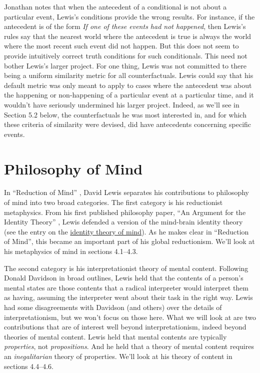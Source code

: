Jonathan \citet{Bennett2003} notes that when the antecedent of a conditional is not about a particular event, Lewis's conditions provide the wrong results. For instance, if the antecedent is of the form \textit{If one of these events had not happened}, then Lewis's rules say that the nearest world where the antecedent is true is always the world where the most recent such event did not happen. But this does not seem to provide intuitively correct truth conditions for such conditionals. This need not bother Lewis's larger project. For one thing, Lewis was not committed to there being a uniform similarity metric for all counterfactuals. Lewis could say that his default metric was only meant to apply to cases where the antecedent was about the happening or non-happening of a particular event at a particular time, and it wouldn't have seriously undermined his larger project. Indeed, as we'll see in Section 5.2 below, the counterfactuals he was most interested in, and for which these criteria of similarity were devised, did have antecedents concerning specific events.

\section{Philosophy of Mind} 
In ``Reduction of Mind'' \citeyearpar{Lewis1994b}, David Lewis separates his contributions to philosophy of mind into two broad categories. The first category is his reductionist metaphysics. From his first published philosophy paper, ``An Argument for the Identity Theory'' \citeyearpar{Lewis1966a}, Lewis defended a version of the mind-brain identity theory (see the entry on the \href{http://plato.stanford.edu/mind-identity/}{identity theory of mind}). As he makes clear in ``Reduction of Mind'', this became an important part of his global reductionism. We'll look at his metaphysics of mind in sections 4.1--4.3.

The second category is his interpretationist theory of mental content. Following Donald Davidson in broad outlines, Lewis held that the contents of a person's mental states are those contents that a radical interpreter would interpret them as having, assuming the interpreter went about their task in the right way. Lewis had some disagreements with Davidson (and others) over the details of interpretationism, but we won't focus on those here. What we will look at are two contributions that are of interest well beyond interpretationism, indeed beyond theories of mental content. Lewis held that mental contents are typically \textit{properties}, not \textit{propositions}. And he held that a theory of mental content requires an \textit{inegalitarian} theory of properties. We'll look at his theory of content in sections 4.4--4.6.

